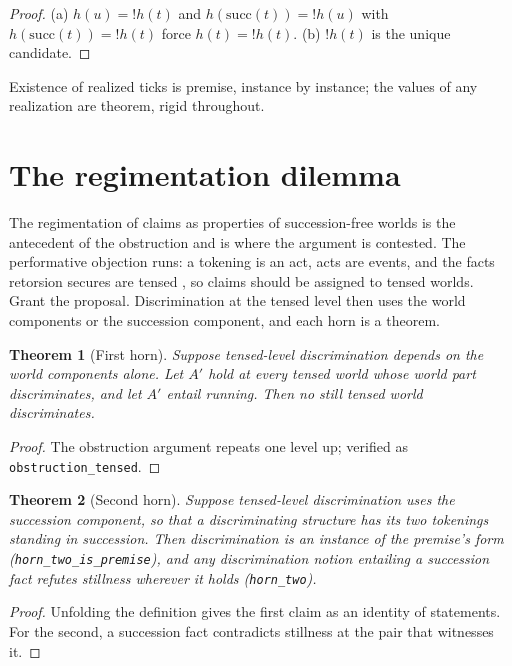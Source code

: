 \documentclass[11pt]{article}
\newtheorem{theorem}{Theorem}[section]
\newcommand{\lf}[1]{\texttt{#1}}
\begin{document}
\begin{proof}
(a) $h(u) = !h(t)$ and $h(\mathrm{succ}(t)) = !h(u)$ with $h(\mathrm{succ}(t)) = !h(t)$ force $h(t) = !h(t)$. (b) $!h(t)$ is the unique candidate.
\end{proof}

Existence of realized ticks is premise, instance by instance; the values of any realization are theorem, rigid throughout.

\section{The regimentation dilemma}
\label{sec:dilemma}

The regimentation of claims as properties of succession-free worlds is the antecedent of the obstruction and is where the argument is contested. The performative objection runs: a tokening is an act, acts are events, and the facts retorsion secures are tensed \cite{apel1980,hintikka1962}, so claims should be assigned to tensed worlds. Grant the proposal. Discrimination at the tensed level then uses the world components or the succession component, and each horn is a theorem.

\begin{theorem}[First horn]
\label{thm:hornone}
Suppose tensed-level discrimination depends on the world components alone. Let $A'$ hold at every tensed world whose world part discriminates, and let $A'$ entail running. Then no still tensed world discriminates.
\end{theorem}

\begin{proof}
The obstruction argument repeats one level up; verified as \lf{obstruction\_tensed}.
\end{proof}

\begin{theorem}[Second horn]
\label{thm:horntwo}
Suppose tensed-level discrimination uses the succession component, so that a discriminating structure has its two tokenings standing in succession. Then discrimination is an instance of the premise's form (\lf{horn\_two\_is\_premise}), and any discrimination notion entailing a succession fact refutes stillness wherever it holds (\lf{horn\_two}).
\end{theorem}

\begin{proof}
Unfolding the definition gives the first claim as an identity of statements. For the second, a succession fact contradicts stillness at the pair that witnesses it.
\end{proof}
\end{document}
